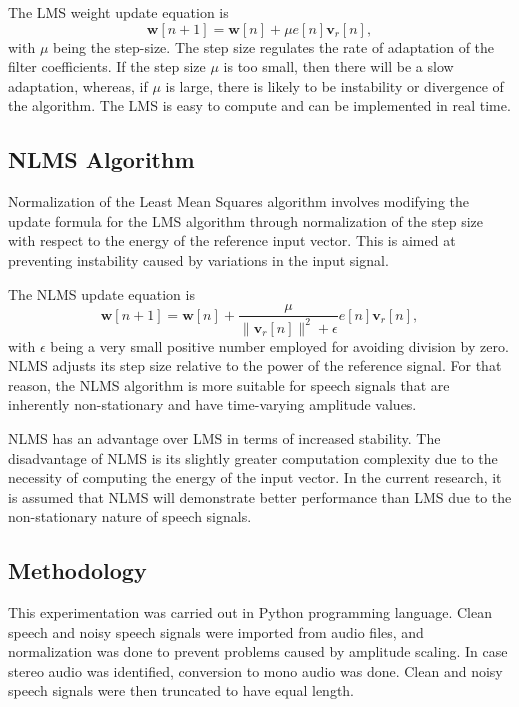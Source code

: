 \documentclass[12pt]{article}
\begin{document}
The LMS weight update equation is
\begin{equation}
\mathbf{w}[n+1] = \mathbf{w}[n] + \mu e[n]\mathbf{v}_r[n],
\end{equation}
with $\mu$ being the step-size. The step size regulates the rate of adaptation of the filter coefficients. If the step size $\mu$ is too small, then there will be a slow adaptation, whereas, if $\mu$ is large, there is likely to be instability or divergence of the algorithm. The LMS is easy to compute and can be implemented in real time.

\subsection{NLMS Algorithm}

Normalization of the Least Mean Squares algorithm involves modifying the update formula for the LMS algorithm through normalization of the step size with respect to the energy of the reference input vector. This is aimed at preventing instability caused by variations in the input signal.

The NLMS update equation is
\begin{equation}
\mathbf{w}[n+1] =
\mathbf{w}[n] +
\frac{\mu}{\|\mathbf{v}_r[n]\|^2+\epsilon}
e[n]\mathbf{v}_r[n],
\end{equation}
with $\epsilon$ being a very small positive number employed for avoiding division by zero. NLMS adjusts its step size relative to the power of the reference signal. For that reason, the NLMS algorithm is more suitable for speech signals that are inherently non-stationary and have time-varying amplitude values.

NLMS has an advantage over LMS in terms of increased stability. The disadvantage of NLMS is its slightly greater computation complexity due to the necessity of computing the energy of the input vector. In the current research, it is assumed that NLMS will demonstrate better performance than LMS due to the non-stationary nature of speech signals.
\subsection{Methodology}

This experimentation was carried out in Python programming language. Clean speech and noisy speech signals were imported from audio files, and normalization was done to prevent problems caused by amplitude scaling. In case stereo audio was identified, conversion to mono audio was done. Clean and noisy speech signals were then truncated to have equal length.
\end{document}
